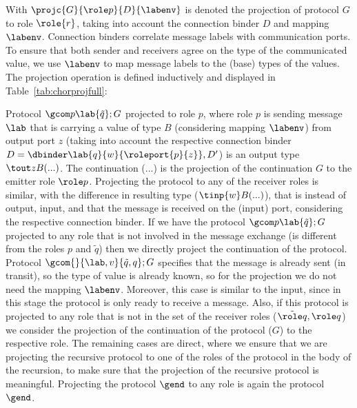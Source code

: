  With $\projc{G}{\role p}{D}{\labenv}$ is denoted the projection of protocol $G$ to  role $\role{r}$, taking into account the connection binder $D$ and mapping $\labenv$. Connection binders correlate message labels with communication ports. To ensure that both sender and receivers agree on the type of the communicated value, we use $\labenv$ to map message labels to the (base) types of the values. The projection operation is defined inductively and displayed in Table~\ref{tab:chorprojfull}:
 
 Protocol $\gcom p \lab{\tilde q};G$ projected to role $p$, where role $p$ is sending message $\lab$ that is carrying a value of type $B$ (considering mapping $\labenv$) from output port $z$ (taking into account the respective connection binder $D =  \dbinder \lab { q}{w}{\roleport{p}{z}},  D'$) is an output type $\tout z B(...)$. The continuation (...) is the projection of the continuation $G$ to the emitter role $\role p$. Projecting the protocol to any of the receiver roles is similar, with the difference in resulting type ($\tinp {w} B(...)$), that is instead of output, input, and that the message is received on the (input) port, considering the respective connection binder. If we have the protocol $\gcom p \lab{\tilde q};G$ projected to any role that is not involved in the message exchange (is different from the roles $p$ and $\tilde q$) then we directly project the continuation of the protocol.
 Protocol $\gcom {} {\lab,v}{\tilde q,q};G$ specifies that the message is already sent (in transit), so the type of value is already known, so for the projection we do not need the mapping $\labenv$. Moreover, this case is similar to the input, since in this stage the protocol is only ready to receive a message. Also, if this protocol is projected to any role that is not in the set of the receiver roles ($\tilde {\role q},\role q$) we consider the projection of the continuation of the protocol ($G$) to the respective role. The remaining cases are direct, where we ensure that we are projecting the recursive protocol to one of the roles of the protocol in the body of the recursion, to make sure that the projection of the recursive protocol is meaningful. Projecting the protocol $\gend$ to any role is again the protocol $\gend$. 
 
 
 
 
 
 
 
 
 
 
 
 
 
 
 
